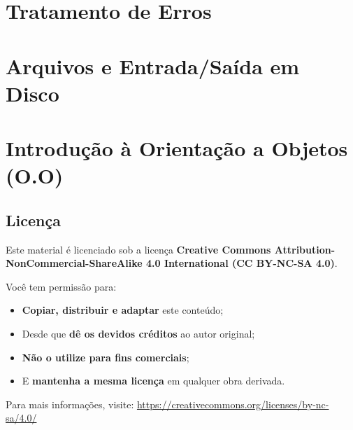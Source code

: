 \documentclass[12pt]{book}
\begin{document}
	\chapter{Tratamento de Erros}
	
	\chapter{Arquivos e Entrada/Saída em Disco}
	
	\chapter{Introdução à Orientação a Objetos (O.O)}
	
	
	
	\newpage
	\section*{Licença \faCreativeCommons}
	
	Este material é licenciado sob a licença \textbf{Creative Commons Attribution-NonCommercial-ShareAlike 4.0 International (CC BY-NC-SA 4.0)}.
	
	\vspace{1em}
	
	Você tem permissão para:
	
	\begin{itemize}
		\item \textbf{Copiar, distribuir e adaptar} este conteúdo;
		\item Desde que \textbf{dê os devidos créditos} ao autor original;
		\item \textbf{Não o utilize para fins comerciais};
		\item E \textbf{mantenha a mesma licença} em qualquer obra derivada.
	\end{itemize}
	
	\vspace{1em}
	
	Para mais informações, visite:  
	\href{https://creativecommons.org/licenses/by-nc-sa/4.0/}{https://creativecommons.org/licenses/by-nc-sa/4.0/}
	
	\vfill
	
	\begin{center}
		\faCreativeCommons\quad
		\faCreativeCommonsBy\quad
		\faCreativeCommonsNc\quad
		\faCreativeCommonsSa
	\end{center}
	
\end{document}
